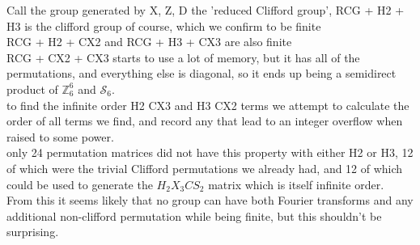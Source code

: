Call the group generated by X, Z, D the 'reduced Clifford group', RCG + H2 + H3 is the clifford group of course, which we confirm to be finite
\\RCG + H2 + CX2 and RCG + H3 + CX3 are also finite
\\RCG + CX2 + CX3 starts to use a lot of memory, but it has all of the permutations, and everything else is diagonal, so it ends up being a semidirect product of $\mathbb{Z}_6^6$ and $\mathcal{S}_6$.
\\to find the infinite order H2 CX3 and H3 CX2 terms we attempt to calculate the order of all terms we find, and record any that lead to an integer overflow when raised to some power.
\\only 24 permutation matrices did not have this property with either H2 or H3, 12 of which were the trivial Clifford permutations we already had, and 12 of which could be used to generate the $H_2 X_3 CS_2$ matrix which is itself infinite order.
\\From this it seems likely that no group can have both Fourier transforms and any additional non-clifford permutation while being finite, but this shouldn't be surprising.